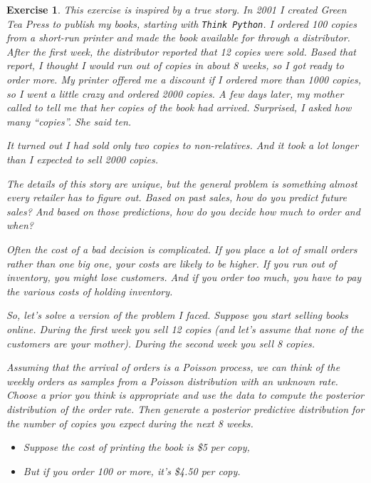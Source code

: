 \documentclass[12pt]{book}
\theoremstyle{exercise}
\newtheorem{exercise}{Exercise}[chapter]
\begin{document}
\begin{exercise}

This exercise is inspired by a true story.  In 2001 I created Green Tea Press to publish my books, starting with {\tt Think Python}.
I ordered 100 copies from a short-run printer and made the book available for through a distributor.  After the first week, the distributor reported that 12 copies were sold.  Based that report, I thought I would run out of copies in about 8 weeks, so I got ready to order more.  My printer offered me a discount if I ordered more than 1000 copies, so I went a little crazy and ordered 2000 copies.  A few days later, my mother called to tell me that her copies of the book had arrived.  Surprised, I asked how many ``copies''.  She said ten.

It turned out I had sold only two copies to non-relatives.  And it took a lot longer than I expected to sell 2000 copies.

The details of this story are unique, but the general problem is something almost every retailer has to figure out.  Based on past sales, how do you predict future sales?  And based on those predictions, how do you decide how much to order and when?

Often the cost of a bad decision is complicated.  If you place a lot of small orders rather than one big one, your costs are likely to be higher.  If you run out of inventory, you might lose customers.  And if you order too much, you have to pay the various costs of holding inventory.

So, let's solve a version of the problem I faced.  Suppose you start selling books online.  During the first week you sell 12 copies (and let's assume that none of the customers are your mother).  During the second week you sell 8 copies.

Assuming that the arrival of orders is a Poisson process, we can think of the weekly orders as samples from a Poisson distribution with an unknown rate.
Choose a prior you think is appropriate and use the data to compute the posterior distribution of the order rate.
Then generate a posterior predictive distribution for the number of copies you expect during the next 8 weeks.

\begin{itemize}

\item Suppose the cost of printing the book is \$5 per copy,

\item But if you order 100 or more, it's \$4.50 per copy.


\end{itemize}
\end{exercise}
\end{document}
